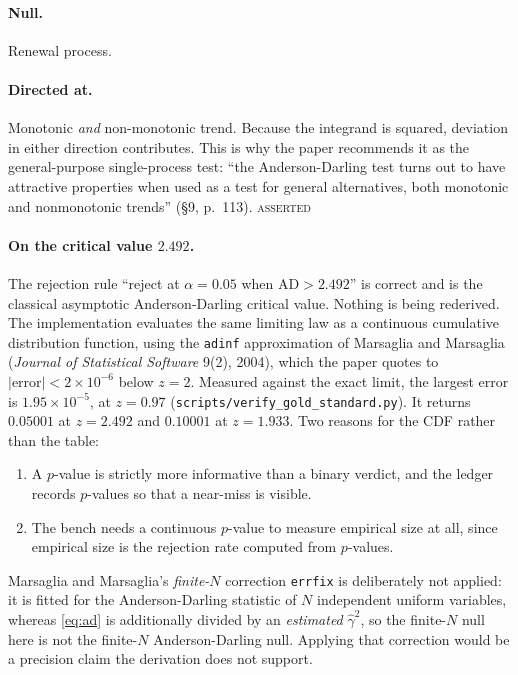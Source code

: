 \documentclass[11pt,a4paper]{article}
\newcommand{\gh}{\hat\gamma}
\newcommand{\ASSERTED}{\textsc{\textcolor{purple!70!black}{asserted}}}
\begin{document}
\paragraph{Null.} Renewal process.

\paragraph{Directed at.} Monotonic \emph{and} non-monotonic trend. Because the
integrand is squared, deviation in either direction contributes. This is why the paper
recommends it as the general-purpose single-process test: \enquote{the Anderson-Darling
test turns out to have attractive properties when used as a test for general
alternatives, both monotonic and nonmonotonic trends} (\S 9, p.~113). \ASSERTED

\paragraph{On the critical value $2.492$.}
The rejection rule \enquote{reject at $\alpha = 0.05$ when $\mathrm{AD} > 2.492$} is
correct and is the classical asymptotic Anderson-Darling critical value. Nothing is
being rederived. The implementation evaluates the same limiting law as a continuous
cumulative distribution function, using the \texttt{adinf} approximation of Marsaglia
and Marsaglia (\emph{Journal of Statistical Software} 9(2), 2004), which the paper quotes
to $|\text{error}| < 2\times 10^{-6}$ below $z = 2$. Measured against the exact limit, the
largest error is $1.95\times 10^{-5}$, at $z = 0.97$
(\texttt{scripts/verify\_gold\_standard.py}). It returns $0.05001$ at $z = 2.492$ and
$0.10001$ at $z = 1.933$. Two reasons for the CDF rather than the table:
\begin{enumerate}[leftmargin=1.6em,itemsep=1pt]
\item A $p$-value is strictly more informative than a binary verdict, and the ledger
records $p$-values so that a near-miss is visible.
\item The bench needs a continuous $p$-value to measure empirical size at all, since
empirical size is the rejection rate computed from $p$-values.
\end{enumerate}
Marsaglia and Marsaglia's \emph{finite-$N$} correction \texttt{errfix} is deliberately
not applied: it is fitted for the Anderson-Darling statistic of $N$ independent uniform
variables, whereas \eqref{eq:ad} is additionally divided by an \emph{estimated}
$\gh^2$, so the finite-$N$ null here is not the finite-$N$ Anderson-Darling null.
Applying that correction would be a precision claim the derivation does not support.
\end{document}

